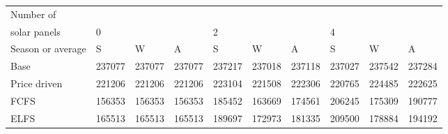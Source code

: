 \begin{table}[h] 
\centering 
\begin{tabular}{l|lll|lll|lll}Number of \\ solar panels&0& & &2& & &4& & \\ \hline 
Season or average & S & W & A & S & W & A & S & W & A \\ \hline 
Base&237077&237077&237077&237217&237018&237118&237027&237542&237284 \\ 
Price driven&221206&221206&221206&223104&221508&222306&220765&224485&222625 \\ 
FCFS&156353&156353&156353&185452&163669&174561&206245&175309&190777 \\ 
ELFS&165513&165513&165513&189697&172973&181335&209500&178884&194192 \\ 
\end{tabular} 
\end{table}